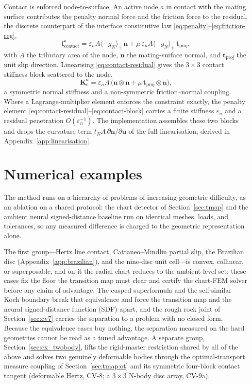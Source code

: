 \documentclass{svjour3}                 %
\newcommand{\nbf}{\bm{n}}
\newcommand{\tbf}{\bm{t}}
\newcommand{\ubf}{\bm{u}}
\newcommand{\fbf}{\bm{f}}
\newcommand{\gn}{g_{\scriptscriptstyle N}}
\newcommand{\pos}[1]{\langle #1\rangle_{+}}
\begin{document}
Contact is enforced node-to-surface. An active node $a$ in contact with the mating surface contributes the
penalty normal force and the friction force to the residual, the discrete counterpart of the interface
constitutive law \eqref{eq:penalty}--\eqref{eq:friction-reg},
\begin{equation}\label{eq:contact-residual}
\fbf^a_{\mathrm{contact}}=\varepsilon_n A\pos{-\gn}\,\nbf+\mu\,\varepsilon_n A\pos{-\gn}\,\tbf_{\mathrm{proj}},
\end{equation}
with $A$ the tributary area of the node, $\nbf$ the mating-surface normal, and $\tbf_{\mathrm{proj}}$ the unit
slip direction. Linearising \eqref{eq:contact-residual} gives the $3\times3$ contact stiffness block scattered
to the node,
\begin{equation}\label{eq:contact-block}
\bm K^a_c=\varepsilon_n A\,\big(\nbf\otimes\nbf+\mu\,\tbf_{\mathrm{proj}}\otimes\nbf\big),
\end{equation}
a symmetric normal stiffness and a non-symmetric friction--normal coupling. Where a Lagrange-multiplier element
enforces the constraint exactly, the penalty element \eqref{eq:contact-residual}--\eqref{eq:contact-block}
carries a finite stiffness $\varepsilon_n$ and a residual penetration $O(\varepsilon_n^{-1})$. The
implementation assembles these two blocks and drops the curvature term $t_N A\,\partial\nbf/\partial\ubf$ of the
full linearisation, derived in Appendix~\ref{app:linearisation}.

\section{Numerical examples}\label{sec:examples}\label{sec:verif}

The method runs on a hierarchy of problems of increasing geometric difficulty, as an ablation on a
shared protocol: the chart detector of Section~\ref{sec:tmap} and the ambient neural signed-distance baseline
run on identical meshes, loads, and tolerances, so any measured difference is charged to the
geometric representation alone.

The first group---Hertz line contact, Cattaneo--Mindlin partial slip, the Brazilian disc
(Appendix~\ref{app:brazilian}), and the nine-disc unit cell---is convex, collinear, or superposable, and on it
the radial chart reduces to the ambient level set; these cases fix the floor the transition map must clear and
certify the chart-FEM solver before any claim of advantage. The cusped superformula and the self-similar Koch
boundary break that equivalence and force the transition map and the neural signed-distance function (SDF)
apart, and the rough rock joint of Section~\ref{sec:cv7} carries the separation to a problem with no closed
form. Because the equivalence cases buy nothing, the separation measured on the hard geometries cannot be read
as a tuned advantage. A separate group, Section~\ref{sec:ex_twobody}, lifts the rigid-master restriction shared
by all of the above and solves two genuinely deformable bodies through the optimal-transport measure coupling of
Section~\ref{sec:tmap:ot} and its symmetric four-block contact tangent (deformable Hertz, CV-8; a $3\times3$
N-body disc array, CV-9a).
\end{document}
